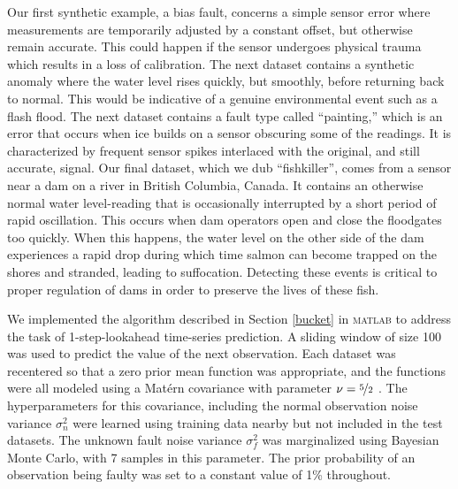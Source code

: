 \documentclass{article}
\begin{document}
Our first synthetic example, a bias fault, concerns a simple sensor
error where measurements are temporarily adjusted by a constant
offset, but otherwise remain accurate. This could happen if the sensor
undergoes physical trauma which results in a loss of calibration.
The next dataset contains a synthetic anomaly where the water level
rises quickly, but smoothly, before returning back to normal. This
would be indicative of a genuine environmental event such as a flash
flood.
The next dataset contains a fault type called ``painting,'' which is
an error that occurs when ice builds on a sensor obscuring some of the
readings. It is characterized by frequent sensor spikes interlaced
with the original, and still accurate, signal.
Our final dataset, which we dub ``fishkiller'', comes from a sensor
near a dam on a river in British Columbia, Canada. It contains an
otherwise normal water level-reading that is occasionally interrupted
by a short period of rapid oscillation. This occurs when dam operators
open and close the floodgates too quickly. When this happens, the
water level on the other side of the dam experiences a rapid drop
during which time salmon can become trapped on the shores and
stranded, leading to suffocation. Detecting these events is critical
to proper regulation of dams in order to preserve the lives of these
fish.


We implemented the algorithm described in Section \ref{bucket} in
\textsc{matlab} to address the task of 1-step-lookahead time-series
prediction.  A sliding window of size 100 was used to predict the
value of the next observation.  Each dataset was recentered so that a
zero prior mean function was appropriate, and the functions were all
modeled using a Mat\'{e}rn covariance with parameter $\nu =
\nicefrac{5}{2}$ \citep{gpml}.  The hyperparameters for this
covariance, including the normal observation noise variance
$\sigma_n^2$ were learned using training data nearby but not included
in the test datasets.  The unknown fault noise variance $\sigma_f^2$
was marginalized using Bayesian Monte Carlo, with 7 samples in this
parameter.  The prior probability of an observation being faulty was
set to a constant value of 1\% throughout.
\end{document}
